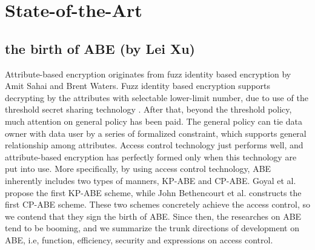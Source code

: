 \section{State-of-the-Art}
\subsection{the birth of ABE (by Lei Xu)}
Attribute-based encryption originates from fuzz identity based encryption \cite{Sahai:TACT'05} by Amit Sahai and Brent Waters. %
Fuzz identity based encryption \cite{Sahai:TACT'05} supports decrypting by the attributes with selectable lower-limit number,
due to use of the threshold secret sharing technology \cite{Shamir:CACM'79}.
After that, beyond the threshold policy, much attention on general policy has been paid.
The general policy can tie data owner with data user by a series of formalized constraint,
which supports general relationship among attributes.
Access control technology just performs well,
and attribute-based encryption has perfectly formed only when this technology are put into use.
More specifically, by using access control technology, ABE inherently includes two types of manners, KP-ABE and CP-ABE.
Goyal et al. \cite{Goyal:CCS'06} propose the first KP-ABE scheme,
while John Bethencourt et al. \cite{Bethencourt:SP'07} constructs the first CP-ABE scheme.
These two schemes concretely achieve the access control,
so we contend that they sign the birth of ABE.
Since then, the researches on ABE tend to be booming,
and we summarize the trunk directions of development on ABE,
i.e, function, efficiency, security and expressions on access control.
